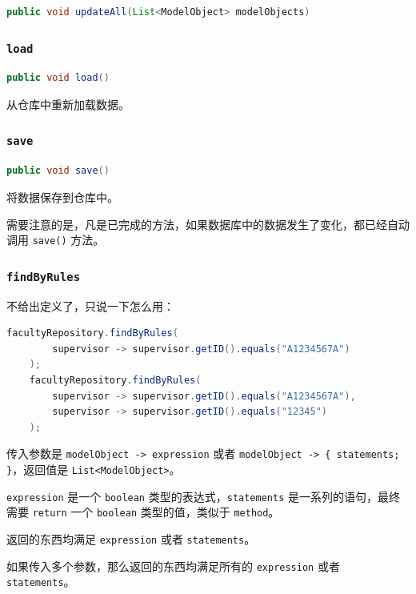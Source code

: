 \documentclass[hyperref,UTF8,12pt,a4paper]{ctexart}
\begin{document}
\begin{lstlisting}[language=Java]
	public void updateAll(List<ModelObject> modelObjects)
\end{lstlisting}

\subsubsection{\texttt{load}}

\begin{lstlisting}[language=Java]
	public void load()
\end{lstlisting}

从仓库中重新加载数据。

\subsubsection{\texttt{save}}

\begin{lstlisting}[language=Java]
	public void save()
\end{lstlisting}

将数据保存到仓库中。

需要注意的是，凡是已完成的方法，如果数据库中的数据发生了变化，都已经自动调用 \texttt{save()} 方法。

\subsubsection{\texttt{findByRules}}

不给出定义了，只说一下怎么用：

\begin{lstlisting}[language=Java]
    facultyRepository.findByRules(
		supervisor -> supervisor.getID().equals("A1234567A")
	);
    facultyRepository.findByRules(
		supervisor -> supervisor.getID().equals("A1234567A"),
		supervisor -> supervisor.getID().equals("12345")
	);
\end{lstlisting}

传入参数是 \texttt{modelObject -> expression} 或者 \texttt{modelObject -> \{ statements; \}}，返回值是 \texttt{List<ModelObject>}。

\texttt{expression} 是一个 \texttt{boolean} 类型的表达式，\texttt{statements} 是一系列的语句，最终需要 \texttt{return} 一个 \texttt{boolean} 类型的值，类似于 \texttt{method}。

返回的东西均满足 \texttt{expression} 或者 \texttt{statements}。

如果传入多个参数，那么返回的东西均满足所有的 \texttt{expression} 或者 \texttt{statements}。
\end{document}
